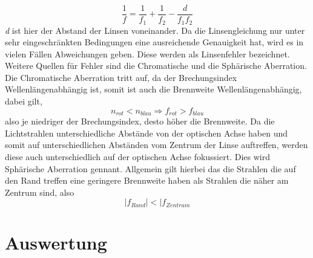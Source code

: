 \begin{equation}
\frac{1}{f}=\frac{1}{f_{1}}+\frac{1}{f_{2}}-\frac{d}{f_{1}f_{2}} \label{linsensystem}
\end{equation}
\textit{d} ist hier der Abstand der Linsen voneinander.
Da die Linsengleichung nur unter sehr eingeschränkten Bedingungen eine ausreichende Genauigkeit hat, wird es in vielen Fällen Abweichungen geben. Diese werden als Linsenfehler bezeichnet.
Weitere Quellen für Fehler sind die Chromatische und die Sphärische Aberration.
Die Chromatische Aberration tritt auf, da der Brechungsindex Wellenlängenabhängig ist, somit ist auch die Brennweite Wellenlängenabhängig, dabei gilt,
\begin{equation}
n_{rot}<n_{blau}\Rightarrow f_{rot}>f_{blau}
\end{equation}
also je niedriger der Brechungsindex, desto höher die Brennweite.
Da die Lichtstrahlen unterschiedliche Abstände von der optischen Achse haben und somit auf unterschiedlichen Abständen vom Zentrum der Linse auftreffen, werden diese auch unterschiedlich auf der optischen Achse fokussiert. Dies wird Sphärische Aberration gennant.
Allgemein gilt hierbei das die Strahlen die auf den Rand treffen eine geringere Brennweite haben als Strahlen die näher am Zentrum sind, also
\begin{equation}
|f_{Rand}|<|f_{Zentrum}
\end{equation}

\newpage
\section{Auswertung}

